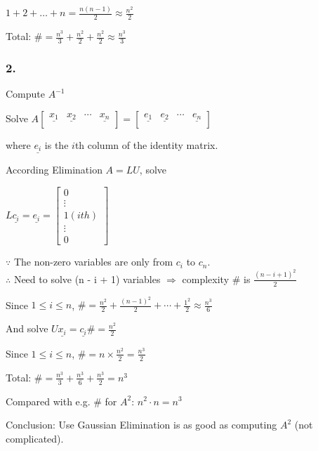 \documentclass[12pt,a4paper]{article}
\begin{document}
$1 + 2 + \hdots + n = \frac{n(n-1)}{2} \approx \frac{n^2}{2}$

Total: $\# = \frac{n^3}{3} + \frac{n^2}{2} + \frac{n^2}{2} \approx \frac{n^3}{3}$

\subsubsection*{2.}

Compute $A^{-1}$

Solve
$
A
\begin{bmatrix}
  \underline{x_1} & \underline{x_2} & \cdots & \underline{x_n} \\
\end{bmatrix} = 
\begin{bmatrix}
  \underline{e_1} & \underline{e_2} & \cdots & \underline{e_n} \\
\end{bmatrix}
$

where $\underline{e_i}$ is the $i$th column of the identity matrix.

According Elimination $A = LU$, solve

$
L\underline{c_i} = \underline{e_i} = 
\begin{bmatrix}
  0 \\
  \vdots \\
  1 (ith) \\
  \vdots \\
  0
\end{bmatrix}
$

$\because$ The non-zero variables are only from $c_i$ to $c_n$. \\
$\therefore$ Need to solve (n - i + 1) variables $\Rightarrow$ complexity $\#$ is $\frac{(n-i+1)^2}{2}$

Since $1 \leq i \leq n$, $\# = \frac{n^2}{2} + \frac{(n-1)^2}{2} + \cdots + \frac{1^2}{2}  \approx \frac{n^3}{6}$

And solve $U\underline{x_i} = \underline{c_i} \# = \frac{n^2}{2}$

Since $1 \leq i \leq n$, $\# = n \times \frac{n^2}{2} = \frac{n^3}{2}$

Total: $\# = \frac{n^3}{3} + \frac{n^3}{6} + \frac{n^3}{2} = n^3$

Compared with e.g. \# for $A^2$: $n^2 \cdot n = n^3$

Conclusion: Use Gaussian Elimination is as good as computing $A^2$ (not complicated).
\end{document}
